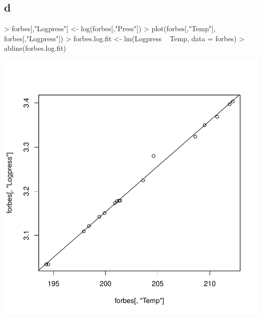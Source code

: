 \subsection{d}
\begin{Schunk}
\begin{Sinput}
> forbes[,"Logpress"] <- log(forbes[,"Press"])
> plot(forbes[,"Temp"], forbes[,"Logpress"])
> forbes.log.fit <- lm(Logpress ~ Temp, data = forbes)
> abline(forbes.log.fit)
\end{Sinput}
\end{Schunk}
\includegraphics{sw12_1-005}

